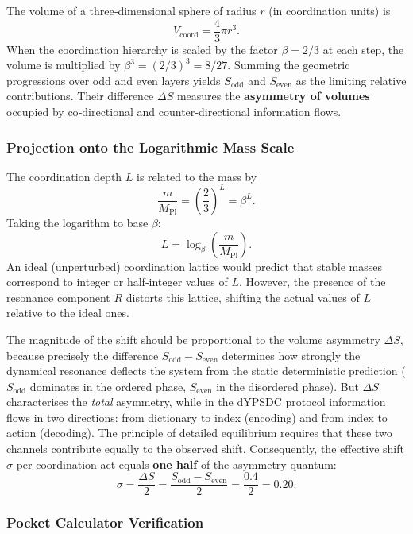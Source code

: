 \documentclass[12pt,a4paper]{article}
\begin{document}
	The volume of a three‑dimensional sphere of radius \(r\) (in coordination units) is
	\[
	V_{\text{coord}} = \frac{4}{3}\pi r^3.
	\]
	When the coordination hierarchy is scaled by the factor \(\beta = 2/3\) at each step, the volume is multiplied by \(\beta^3 = (2/3)^3 = 8/27\). Summing the geometric progressions over odd and even layers yields \(S_{\mathrm{odd}}\) and \(S_{\mathrm{even}}\) as the limiting relative contributions. Their difference \(\Delta S\) measures the \textbf{asymmetry of volumes} occupied by co‑directional and counter‑directional information flows.
	
	\subsubsection{Projection onto the Logarithmic Mass Scale}
	
	The coordination depth \(L\) is related to the mass by
	\[
	\frac{m}{M_{\mathrm{Pl}}} = \left(\frac{2}{3}\right)^L = \beta^L.
	\]
	Taking the logarithm to base \(\beta\):
	\[
	L = \log_{\beta}\left(\frac{m}{M_{\mathrm{Pl}}}\right).
	\]
	An ideal (unperturbed) coordination lattice would predict that stable masses correspond to integer or half‑integer values of \(L\). However, the presence of the resonance component \(R\) distorts this lattice, shifting the actual values of \(L\) relative to the ideal ones.
	
	The magnitude of the shift should be proportional to the volume asymmetry \(\Delta S\), because precisely the difference \(S_{\mathrm{odd}} - S_{\mathrm{even}}\) determines how strongly the dynamical resonance deflects the system from the static deterministic prediction (\(S_{\mathrm{odd}}\) dominates in the ordered phase, \(S_{\mathrm{even}}\) in the disordered phase). But \(\Delta S\) characterises the \textit{total} asymmetry, while in the dYPSDC protocol information flows in two directions: from dictionary to index (encoding) and from index to action (decoding). The principle of detailed equilibrium requires that these two channels contribute equally to the observed shift. Consequently, the effective shift \(\sigma\) per coordination act equals \textbf{one half} of the asymmetry quantum:
	\begin{equation}
		\boxed{\sigma = \frac{\Delta S}{2} = \frac{S_{\mathrm{odd}} - S_{\mathrm{even}}}{2} = \frac{0.4}{2} = 0.20.}
		\label{eq:sigma_final}
	\end{equation}
	
	\subsubsection{Pocket Calculator Verification}
	
\end{document}
